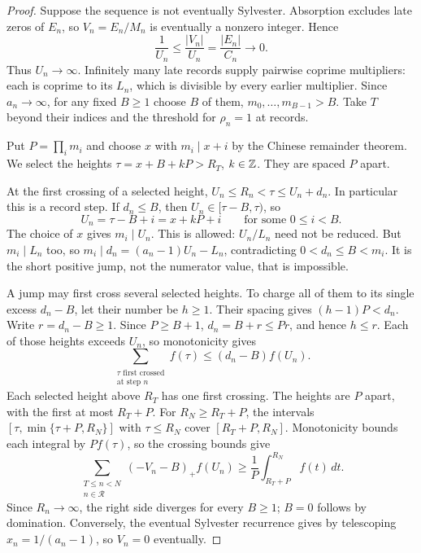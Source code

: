 \documentclass[11pt]{article}
\begin{document}
\begin{proof}
Suppose the sequence is not eventually Sylvester. Absorption excludes
late zeros of $E_n$, so $V_n=E_n/M_n$ is eventually a nonzero integer.
Hence
\[
 \frac1{U_n}\le\frac{|V_n|}{U_n}=\frac{|E_n|}{C_n}\longrightarrow0.
\]
Thus $U_n\to\infty$. Infinitely many late records supply pairwise
coprime multipliers: each is coprime to its $L_n$, which is divisible by
every earlier multiplier. Since $a_n\to\infty$, for any fixed $B\ge1$
choose $B$ of them, $m_0,\ldots,m_{B-1}>B$. Take $T$ beyond their
indices and the threshold for $\rho_n=1$ at records.

Put $P=\prod_i m_i$ and choose $x$ with $m_i\mid x+i$ by the
Chinese remainder theorem. We select the heights
$\tau=x+B+kP>R_T$, $k\in\mathbb{Z}$. They are spaced $P$ apart.

At the first crossing of a selected height,
$U_n\le R_n<\tau\le U_n+d_n$. In particular this is a record step.
If $d_n\le B$, then $U_n\in[\tau-B,\tau)$, so
\[
 U_n=\tau-B+i=x+kP+i\qquad\text{for some }0\le i<B.
\]
The choice of $x$ gives $m_i\mid U_n$. This is allowed: $U_n/L_n$
need not be reduced. But $m_i\mid L_n$ too, so
$m_i\mid d_n=(a_n-1)U_n-L_n$, contradicting $0<d_n\le B<m_i$.
It is the short positive jump, not the numerator value, that is impossible.

A jump may first cross several selected heights. To charge all of them
to its single excess $d_n-B$, let their number be $h\ge1$. Their spacing gives
$(h-1)P<d_n$. Write $r=d_n-B\ge1$. Since $P\ge B+1$,
$d_n=B+r\le Pr$, and hence $h\le r$. Each of those heights exceeds
$U_n$, so monotonicity gives
\[
 \sum_{\substack{\tau\text{ first crossed}\\\text{at step }n}}f(\tau)
 \le(d_n-B)f(U_n).
\]
Each selected height above $R_T$ has one first crossing. The heights are
$P$ apart, with the first at most $R_T+P$. For $R_N\ge R_T+P$, the
intervals $[\tau,\min\{\tau+P,R_N\}]$ with $\tau\le R_N$ cover $[R_T+P,R_N]$.
Monotonicity bounds each integral by $P f(\tau)$, so the crossing bounds give
\begin{equation}\label{eq:weightedcrossing}
 \sum_{\substack{T\le n<N\\n\in\mathcal R}}(-V_n-B)_+f(U_n)
 \ge\frac1P\int_{R_T+P}^{R_N} f(t)\,dt.
\end{equation}
Since $R_n\to\infty$, the right side diverges for every $B\ge1$;
$B=0$ follows by domination. Conversely, the eventual Sylvester recurrence
gives by telescoping
$x_n=1/(a_n-1)$, so $V_n=0$ eventually.
\end{proof}
\end{document}
